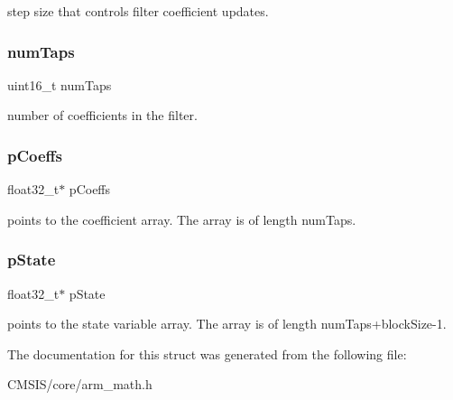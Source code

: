 step size that controls filter coefficient updates. \mbox{\label{structarm__lms__instance__f32_a751941891e47f522a7f5375fe8990aac}} 
\subsubsection{\texorpdfstring{num\+Taps}{numTaps}}
{\footnotesize\ttfamily uint16\+\_\+t num\+Taps}

number of coefficients in the filter. \mbox{\label{structarm__lms__instance__f32_aacbb8dd8eeba4b21fc2bb40076405ee3}} 
\subsubsection{\texorpdfstring{p\+Coeffs}{pCoeffs}}
{\footnotesize\ttfamily float32\+\_\+t$\ast$ p\+Coeffs}

points to the coefficient array. The array is of length num\+Taps. \mbox{\label{structarm__lms__instance__f32_a335c87e6fdc4b96601d95a5de8b9c463}} 
\subsubsection{\texorpdfstring{p\+State}{pState}}
{\footnotesize\ttfamily float32\+\_\+t$\ast$ p\+State}

points to the state variable array. The array is of length num\+Taps+block\+Size-\/1. 

The documentation for this struct was generated from the following file\+:\begin{DoxyCompactItemize}
\item 
C\+M\+S\+I\+S/core/arm\+\_\+math.\+h\end{DoxyCompactItemize}
